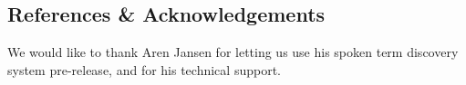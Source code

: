 \documentclass[final]{beamer}
\begin{document}
\begin{frame}[t]
\begin{multicols}{2}

\subsection{References \& Acknowledgements}

\nocite{*} %


\vspace{1cm}
We would like to thank Aren Jansen for letting us use his spoken term discovery system pre-release, and for his technical support.


\end{multicols}

\end{frame}
\end{document}
